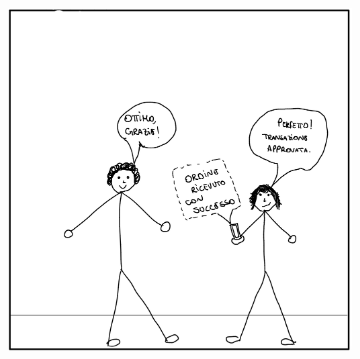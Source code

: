 \documentclass{article}
\begin{document}
\begin{figure}[H]
\begin{subfigure}{0.25\textwidth}
    \end{subfigure}
    \hspace{0.02\textwidth}
    \begin{subfigure}{0.25\textwidth}
        \leftskip -4.33cm
        \includegraphics[width=\textwidth]{Storyboard/task1-img/t1.4.png}
    \end{subfigure}
\end{figure}
\end{document}
